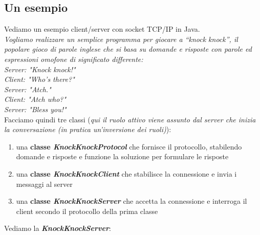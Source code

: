 \documentclass[a4paper,12pt, oneside]{book}
\begin{document}
\subsection{Un esempio}
Vediamo un esempio client/server con socket TCP/IP in Java.\\
\textit{Vogliamo realizzare un semplice programma per giocare a “knock knock”, il popolare gioco di parole inglese che si basa su domande e risposte con parole ed espressioni omofone di significato differente:}\\
\textit{Server: "Knock knock!"\\
	Client: "Who's there?"\\
	Server: "Atch."\\
	Client: "Atch who?"\\
	Server: "Bless you!"}
\\
Facciamo quindi tre classi (\textit{qui il ruolo attivo viene assunto dal server che inizia la
	conversazione (in pratica un'inversione dei ruoli)}):
\begin{enumerate}
	\item una \textbf{classe \textit{KnockKnockProtocol}} che fornisce il protocollo, stabilendo domande e risposte e funzione la soluzione per formulare le risposte
	\item una \textbf{classe \textit{KnockKnockClient}} che stabilisce la connessione e invia i messaggi al server
	\item una \textbf{classe \textit{KnockKnockServer}} che accetta la connessione e interroga il client secondo il protocollo della prima classe
\end{enumerate}
\newpage
Vediamo la \textbf{\textit{KnockKnockServer}}:
\end{document}
